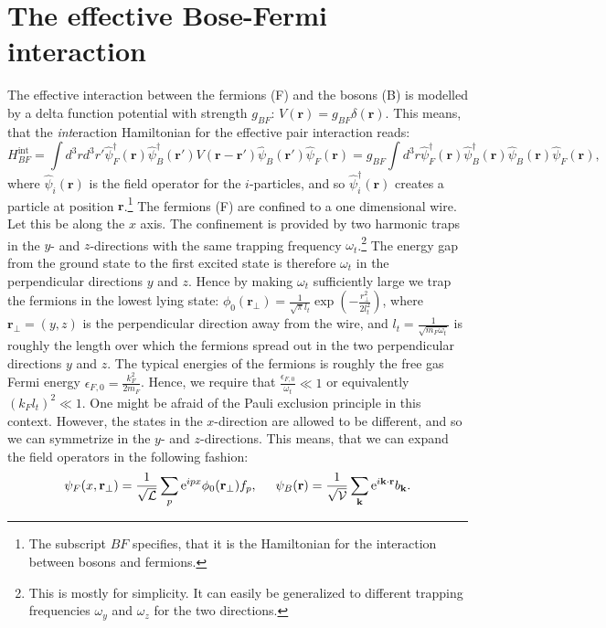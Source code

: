 \section{The effective Bose-Fermi interaction}
The effective interaction between the fermions (F) and the bosons (B) is modelled by a delta function potential with strength $g_{BF}$: $V(\mathbf{r})=g_{BF}\delta(\mathbf{r})$. This means, that the \textit{int}eraction Hamiltonian for the effective pair interaction reads:
\begin{equation}
H_{BF}^\text{int}  = \int d^3 r d^3 r' \hat{\psi}_F^\dagger(\mathbf{r}) \hat{\psi}_B^\dagger(\mathbf{r}')V(\mathbf{r}-\mathbf{r}')\hat{\psi}_B(\mathbf{r}')\hat{\psi}_F(\mathbf{r}) = g_{BF}\int d^3 r \hat{\psi}_F^\dagger(\mathbf{r}) \hat{\psi}_B^\dagger(\mathbf{r})\hat{\psi}_B(\mathbf{r})\hat{\psi}_F(\mathbf{r}),
\end{equation}
where $\hat{\psi}_i(\mathbf{r})$ is the field operator for the $i$-particles, and so $\hat{\psi}_i^\dagger(\mathbf{r})$ creates a particle at position $\mathbf{r}$.\footnote{The subscript $BF$ specifies, that it is the Hamiltonian for the interaction between bosons and fermions.} The fermions (F) are confined to a one dimensional wire. Let this be along the $x$ axis. The confinement is provided by two harmonic traps in the $y$- and $z$-directions with the same trapping frequency $\omega_t$.\footnote{This is mostly for simplicity. It can easily be generalized to different trapping frequencies $\omega_y$ and $\omega_z$ for the two directions.} The energy gap from the ground state to the first excited state is therefore $\omega_t$ in the perpendicular directions $y$ and $z$. Hence by making $\omega_t$ sufficiently large we trap the fermions in the lowest lying state: $\phi_0(\mathbf{r}_\perp) = \frac{1}{\sqrt{\pi}l_t}\exp\left(-\frac{r_\perp^2}{2l_t^2}\right)$, where $\mathbf{r}_\perp = (y,z)$ is the perpendicular direction away from the wire, and $l_t = \frac{1}{\sqrt{m_F \omega_t}}$ is roughly the length over which the fermions spread out in the two perpendicular directions $y$ and $z$. The typical energies of the fermions is roughly the free gas Fermi energy $\epsilon_{F,0} = \frac{k_F^2}{2m_F}$. Hence, we require that $\frac{\epsilon_{F,0}}{\omega_t} \ll 1$ or equivalently $(k_Fl_t)^2\ll 1$. One might be afraid of the Pauli exclusion principle in this context. However, the states in the $x$-direction are allowed to be different, and so we can symmetrize in the $y$- and $z$-directions. This means, that we can expand the field operators in the following fashion:
\begin{equation}
\psi_F(x,\mathbf{r}_\perp) = \frac{1}{\sqrt{\mathcal{L}}}\sum_p \text{e}^{ipx} \phi_0(\mathbf{r}_\perp) f_p, \hspace{0.5cm} \psi_B(\mathbf{r}) = \frac{1}{\sqrt{\mathcal{V}}}\sum_{\mathbf{k}} \text{e}^{i\mathbf{k}\cdot \mathbf{r}} b_\mathbf{k}. 
\end{equation}   
